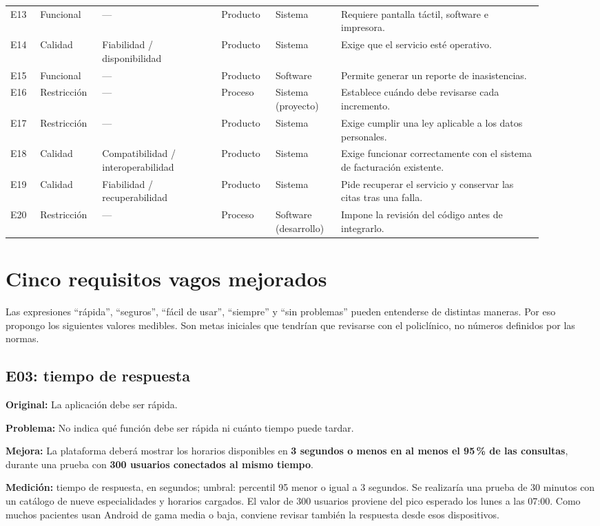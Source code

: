 \documentclass[conference,onecolumn]{IEEEtran}
\begin{document}
\begin{longtable}{@{}p{0.055\linewidth}p{0.09\linewidth}p{0.205\linewidth}p{0.09\linewidth}p{0.115\linewidth}p{0.34\linewidth}@{}}
E13 & Funcional & --- & Producto & Sistema & Requiere pantalla táctil, software e impresora. \\
E14 & Calidad & Fiabilidad / disponibilidad & Producto & Sistema & Exige que el servicio esté operativo. \\
E15 & Funcional & --- & Producto & Software & Permite generar un reporte de inasistencias. \\
E16 & Restricción & --- & Proceso & Sistema (proyecto) & Establece cuándo debe revisarse cada incremento. \\
E17 & Restricción & --- & Producto & Sistema & Exige cumplir una ley aplicable a los datos personales. \\
E18 & Calidad & Compatibilidad / interoperabilidad & Producto & Sistema & Exige funcionar correctamente con el sistema de facturación existente. \\
E19 & Calidad & Fiabilidad / recuperabilidad & Producto & Sistema & Pide recuperar el servicio y conservar las citas tras una falla. \\
E20 & Restricción & --- & Proceso & Software (desarrollo) & Impone la revisión del código antes de integrarlo. \\
\end{longtable}
\endgroup

\section{Cinco requisitos vagos mejorados}
Las expresiones \enquote{rápida}, \enquote{seguros}, \enquote{fácil de usar}, \enquote{siempre} y \enquote{sin problemas} pueden entenderse de distintas maneras. Por eso propongo los siguientes valores medibles. Son metas iniciales que tendrían que revisarse con el policlínico, no números definidos por las normas.

\subsection{E03: tiempo de respuesta}
\textbf{Original:} La aplicación debe ser rápida.

\textbf{Problema:} No indica qué función debe ser rápida ni cuánto tiempo puede tardar.

\textbf{Mejora:} La plataforma deberá mostrar los horarios disponibles en \textbf{3 segundos o menos en al menos el 95\,\% de las consultas}, durante una prueba con \textbf{300 usuarios conectados al mismo tiempo}.

\textbf{Medición:} tiempo de respuesta, en segundos; umbral: percentil 95 menor o igual a 3 segundos. Se realizaría una prueba de 30 minutos con un catálogo de nueve especialidades y horarios cargados. El valor de 300 usuarios proviene del pico esperado los lunes a las 07:00. Como muchos pacientes usan Android de gama media o baja, conviene revisar también la respuesta desde esos dispositivos.
\end{document}
